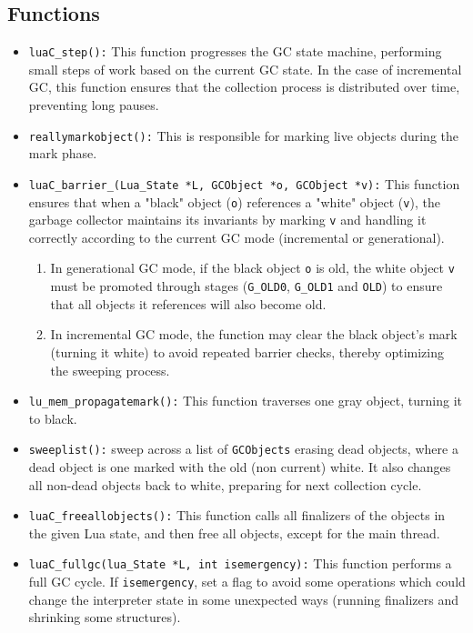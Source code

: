 \documentclass[11pt,paper=a4,answers]{exam}
\begin{document}
\subsection{Functions}
\begin{itemize}
    \item \verb|luaC_step():| This function progresses the GC state machine, performing small steps of work based on the current GC state. In the case of incremental GC, this function ensures that the collection process is distributed over time, preventing long pauses.
    \item \verb|reallymarkobject():| This is responsible for marking live objects during the mark phase.
    \item \verb|luaC_barrier_(Lua_State *L, GCObject *o, GCObject *v):| This function ensures that when a "black" object (\verb|o|) references a "white" object (\verb|v|), the garbage collector maintains its invariants by marking \verb|v| and handling it correctly according to the current GC mode (incremental or generational).
    \begin{enumerate}
        \item In generational GC mode, if the black object \verb|o| is old, the white object  \verb|v| must be promoted through stages (\verb|G_OLD0|, \verb|G_OLD1| and \verb|OLD|) to ensure that all objects it references will also become old.
        \item In incremental GC mode, the function may clear the black object's mark (turning it white) to avoid repeated barrier checks, thereby optimizing the sweeping process. 
    \end{enumerate}
    \item \verb|lu_mem_propagatemark():| This function traverses one gray object, turning it to black.
    \item \verb|sweeplist():| sweep across a list of \verb|GCObjects| erasing dead objects, where a dead object is one marked with the old (non current) white. It also changes all non-dead objects back to white, preparing for next collection cycle.    
    \item \verb|luaC_freeallobjects():| This function calls all finalizers of the objects in the given Lua state, and then free all objects, except for the main thread.
    \item \verb|luaC_fullgc(lua_State *L, int isemergency):| This function performs a full GC cycle. If \verb|isemergency|, set a flag to avoid some operations which could change the interpreter state in some unexpected ways (running finalizers and shrinking some structures).
\end{itemize}
\end{document}
